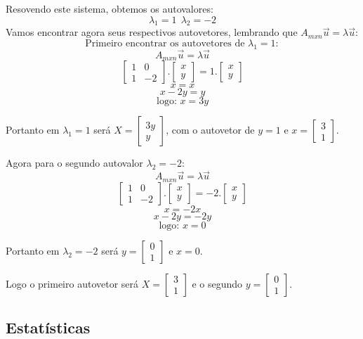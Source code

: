\documentclass[
  openany]{book}
\begin{document}
Resovendo este sistema, obtemos os autovalores:
\[\lambda_1=1 \ \ \lambda_2=-2\]
Vamos encontrar agora seus respectivos autovetores, lembrando que \(A_{mxn}\vec{u}=\lambda \vec{u}\):
\[ \mbox{Primeiro encontrar os autovetores de }\lambda_1=1:\]
\[A_{mxn}\vec{u}=\lambda \vec{u}\]
\[\begin{bmatrix}
1 &0 \\ 
1 &-2 
\end{bmatrix}. \begin{bmatrix}
x \\ 
y  
\end{bmatrix}=1.\begin{bmatrix}
x \\ 
y  
\end{bmatrix} \]
\[x=x \]
\[x-2y=y \]
\[\mbox{logo: } x=3y\]

Portanto em \(\lambda_1=1\) será \(X=\begin{bmatrix}3y\\y\end{bmatrix}\), com o autovetor de \(y=1\) e \(x=\begin{bmatrix}3\\1\end{bmatrix}\).

Agora para o segundo autovalor \(\lambda_2=-2\):
\[A_{mxn}\vec{u}=\lambda \vec{u} \]
\[\begin{bmatrix}
1 &0 \\ 
1 &-2 
\end{bmatrix}. \begin{bmatrix}
x \\ 
y  
\end{bmatrix}=-2.\begin{bmatrix}
x \\ 
y  
\end{bmatrix} \]
\[x=-2x\]
\[x-2y=-2y \]
\[ \mbox{logo: } x=0\]

Portanto em \(\lambda_2=-2\) será \(y=\begin{bmatrix}0\\1\end{bmatrix}\) e \(x=0\).

Logo o primeiro autovetor será \(X=\begin{bmatrix}3\\1\end{bmatrix}\) e o segundo \(y=\begin{bmatrix}0\\1\end{bmatrix}\).

\hypertarget{estatuxedsticas}{%
\subsection{Estatísticas}\label{estatuxedsticas}}
\end{document}

